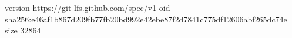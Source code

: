 version https://git-lfs.github.com/spec/v1
oid sha256:e46af1b867d209fb77fb20bd992e42ebe87f2d7841c775df12606abf265dc74e
size 32864
